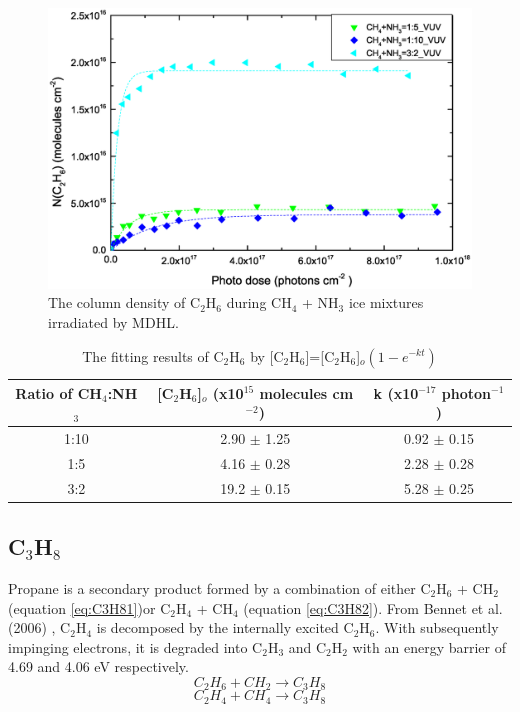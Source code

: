 \begin{figure}
\centering
\includegraphics[width=\textwidth]{figures/chapter3/Lab_C2H6.eps}
\caption{The column density of C$_2$H$_6$ during CH$_4$ + NH$_3$ ice mixtures irradiated by MDHL. }
\label{fig:lab_C2H6}
\end{figure}

\begin{table}[htbp]
\caption{The fitting results of C$_2$H$_6$ by [C$_2$H$_6$]=[C$_2$H$_6$]$_o(1 - e^{-kt})$}
\label{tab:fittingC2H6}
\begin{tabular}{ccc}
\hline
\hline
Ratio of CH$_4$:NH$_3$ & [C$_2$H$_6$]$_o$ (x10$^{15}$ molecules cm$^{-2}$) & k (x10$^{-17}$ photon$^{-1}$) \\
\hline
1:10 & 2.90 $\pm$ 1.25 & 0.92 $\pm$ 0.15 \\
1:5 & 4.16 $\pm$ 0.28 & 2.28 $\pm$ 0.28 \\
3:2 & 19.2 $\pm$ 0.15 & 5.28 $\pm$ 0.25 \\
\hline
\end{tabular}
\end{table}


\subsection{C$_3$H$_8$}

Propane is a secondary product formed by a combination of either C$_2$H$_6$ + CH$_2$ (equation \ref{eq:C3H81})or C$_2$H$_4$ + CH$_4$ (equation \ref{eq:C3H82}). From Bennet et al. (2006) \cite{bennett2006laboratory}, C$_2$H$_4$ is decomposed by the internally excited C$_2$H$_6$. With subsequently impinging electrons, it is degraded into C$_2$H$_3$ and C$_2$H$_2$ with an energy barrier of 4.69 and 4.06 eV respectively.
\begin{equation}
C_2H_6 + CH_2 \rightarrow C_3H_8
\label{eq:C3H81}
\end{equation}
\begin{equation}
C_2H_4 + CH_4 \rightarrow C_3H_8
\label{eq:C3H82}
\end{equation}

